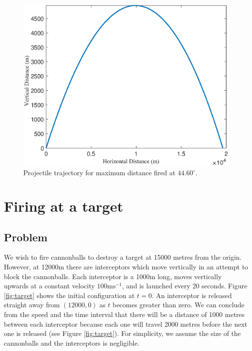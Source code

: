 \documentclass[11pt]{report}
\begin{document}
\begin{figure}[h]
	\centering
  	\includegraphics[scale=0.48]{assets/max_dist_plot.eps}
  	\caption{Projectile trajectory for maximum distance fired at $44.60^{\circ}$.}
  	\label{fig:plot}
\end{figure}

\chapter{Firing at a target}
\section*{Problem}
We wish to fire cannonballs to destroy a target at 15000 metres from the origin. However, at 12000m there are interceptors which move vertically in an attempt to block the cannonballs. Each interceptor is a 1000m long, moves vertically upwards at a constant velocity $100\text{ms}^{-1}$, and is launched every 20 seconds. Figure \ref{fig:target} shows the initial configuration at $t=0$. An interceptor is released straight away from $(12000, 0)$ as $t$ becomes greater than zero. We can conclude from the speed and the time interval that there will be a distance of 1000 metres between each interceptor because each one will travel 2000 metres before the next one is released (see Figure \ref{fig:target}). For simplicity, we assume the size of the cannonballs and the interceptors is negligible.\\
\end{document}
